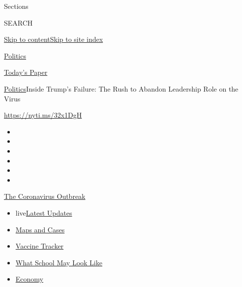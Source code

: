 Sections

SEARCH

\protect\hyperlink{site-content}{Skip to
content}\protect\hyperlink{site-index}{Skip to site index}

\href{https://www.nytimes.com/section/politics}{Politics}

\href{https://myaccount.nytimes.com/auth/login?response_type=cookie\&client_id=vi}{}

\href{https://www.nytimes.com/section/todayspaper}{Today's Paper}

\href{/section/politics}{Politics}\textbar{}Inside Trump's Failure: The
Rush to Abandon Leadership Role on the Virus

\url{https://nyti.ms/32x1DgH}

\begin{itemize}
\item
\item
\item
\item
\item
\item
\end{itemize}

\href{https://www.nytimes.com/news-event/coronavirus?action=click\&pgtype=Article\&state=default\&region=TOP_BANNER\&context=storylines_menu}{The
Coronavirus Outbreak}

\begin{itemize}
\tightlist
\item
  live\href{https://www.nytimes.com/2020/08/01/world/coronavirus-covid-19.html?action=click\&pgtype=Article\&state=default\&region=TOP_BANNER\&context=storylines_menu}{Latest
  Updates}
\item
  \href{https://www.nytimes.com/interactive/2020/us/coronavirus-us-cases.html?action=click\&pgtype=Article\&state=default\&region=TOP_BANNER\&context=storylines_menu}{Maps
  and Cases}
\item
  \href{https://www.nytimes.com/interactive/2020/science/coronavirus-vaccine-tracker.html?action=click\&pgtype=Article\&state=default\&region=TOP_BANNER\&context=storylines_menu}{Vaccine
  Tracker}
\item
  \href{https://www.nytimes.com/interactive/2020/07/29/us/schools-reopening-coronavirus.html?action=click\&pgtype=Article\&state=default\&region=TOP_BANNER\&context=storylines_menu}{What
  School May Look Like}
\item
  \href{https://www.nytimes.com/live/2020/07/31/business/stock-market-today-coronavirus?action=click\&pgtype=Article\&state=default\&region=TOP_BANNER\&context=storylines_menu}{Economy}
\end{itemize}

